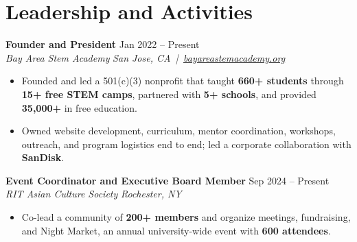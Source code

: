 \documentclass[10pt,letterpaper]{article}
\newif\ifresumeFirstRole
\newcommand{\resumeRole}[4]{%
  \ifresumeFirstRole
    \global\resumeFirstRolefalse
  \else
    \vspace{0pt plus 1fill}%
  \fi
  \textbf{#1} \hfill #2\\
  \textit{#3} \hfill \textit{#4}
}
\begin{document}
\section*{Leadership and Activities}
\resumeRole{Founder and President}{Jan 2022 -- Present}{Bay Area Stem Academy}{San Jose, CA \,|\, \href{https://bayareastemacademy.org}{bayareastemacademy.org}}
\begin{itemize}
  \item Founded and led a 501(c)(3) nonprofit that taught \textbf{660+ students} through \textbf{15+ free STEM camps}, partnered with \textbf{5+ schools}, and provided \textbf{\textdollar{}35,000+} in free education.
  \item Owned website development, curriculum, mentor coordination, workshops, outreach, and program logistics end to end; led a corporate collaboration with \textbf{SanDisk}.
\end{itemize}

\resumeRole{Event Coordinator and Executive Board Member}{Sep 2024 -- Present}{RIT Asian Culture Society}{Rochester, NY}
\begin{itemize}
  \item Co-lead a community of \textbf{200+ members} and organize meetings, fundraising, and Night Market, an annual university-wide event with \textbf{600 attendees}.
\end{itemize}
\end{document}
